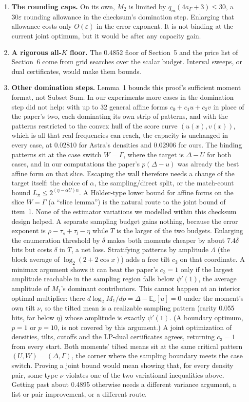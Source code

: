\documentclass[11pt]{article}
\newcommand{\E}{\mathbb{E}}
\newcommand{\eps}{\varepsilon}
\theoremstyle{plain}
\begin{document}
\begin{enumerate}
\item \textbf{The rounding caps.} On its own, $M_2$ is limited by $q_m(4a_\Gamma+3) \le 30$, a $30\eps$ rounding allowance in the checksum's domination step. Enlarging that allowance costs only $O(\eps)$ in the error exponent. It is not binding at the current joint optimum, but it would be after any capacity gain.
\item \textbf{A rigorous all-$K$ floor.} The 0.4852 floor of Section~5 and the price list of Section~6 come from grid searches over the scalar budget. Interval sweeps, or dual certificates, would make them bounds.
\item \textbf{Other domination steps.} Lemma~1 bounds this proof's sufficient moment format, not Subset Sum. In our experiments more cases in the domination step did not help: with up to 32 general affine forms $c_0 + c_1 u + c_2 v$ in place of the paper's two, each dominating its own strip of patterns, and with the patterns restricted to the convex hull of the score curve $(u(x), v(x))$, which is all that real frequencies can reach, the capacity is unchanged in every case, at 0.02810 for Astra's densities and 0.02906 for ours. The binding patterns sit at the case switch $W = \Gamma$, where the target is $\Delta - U$ for both cases, and in our computations the paper's $p(\Delta - u)$ was already the best affine form on that slice. Escaping the wall therefore needs a change of the target itself: the choice of $\alpha$, the sampling/direct split, or the match-count bound $L_\pi \le 2^{(\eta - \alpha U)n}$. A H\"older-type lower bound for affine forms on the slice $W = \Gamma$ (a ``slice lemma'') is the natural route to the joint bound of item~1. None of the estimator variations we modelled within this checksum design helped. A separate sampling budget gains nothing, because the error exponent is $\rho - \tau_s + \tau_l - \eta$ while $T$ is the larger of the two budgets. Enlarging the enumeration threshold by $\delta$ makes both moments cheaper by about $7.4\delta$ bits but costs $\delta$ in $T$, a net loss. Stratifying patterns by amplitude $\Lambda$ (the block average of $\log_2(2+2\cos x)$) adds a free tilt $c_3$ on that coordinate. A minimax argument shows it can beat the paper's $c_3 = 1$ only if the largest amplitude reachable in the sampling region falls below $\psi'(1)$, the average amplitude of $M_1$'s dominant contributors. This cannot happen at an interior optimal multiplier: there $d \log_2 M_1/dp = \Delta - \E_\nu[u] = 0$ under the moment's own tilt $\nu$, so the tilted mean is a realizable sampling pattern (rarity 0.055 bits, far below $\eta$) whose amplitude is exactly $\psi'(1)$. (A boundary optimum, $p = 1$ or $p = 10$, is not covered by this argument.) A joint optimization of densities, tilts, cutoffs and the LP-dual certificates agrees, returning $c_3 = 1$ from every start. Both moments' tilted means sit at the same critical pattern $(U, W) = (\Delta, \Gamma)$, the corner where the sampling boundary meets the case switch. Proving a joint bound would mean showing that, for every density pair, some type $\nu$ violates one of the two variational inequalities above. Getting past about 0.4895 otherwise needs a different variance argument, a list or pair improvement, or a different route.

\end{enumerate}
\end{document}
